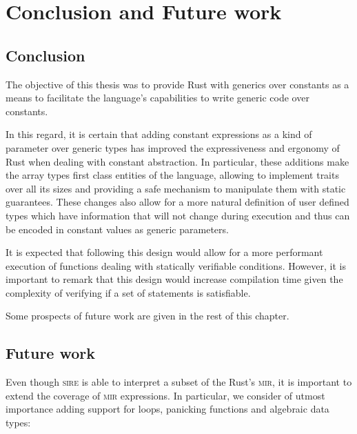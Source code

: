 \chapter{Conclusion and Future work}
\label{chap:conclusion}

\section{Conclusion}

The objective of this thesis was to provide Rust with generics over constants
as a means to facilitate the language's capabilities to write generic code over
constants.

In this regard, it is certain that adding constant expressions as a kind of
parameter over generic types has improved the expressiveness and ergonomy of
Rust when dealing with constant abstraction. In particular, these additions
make the array types first class entities of the language, allowing to
implement traits over all its sizes and providing a safe mechanism to
manipulate them with static guarantees. These changes also allow for a more
natural definition of user defined types which have information that will not
change during execution and thus can be encoded in constant values as generic
parameters.

It is expected that following this design would allow for a more performant
execution of functions dealing with statically verifiable conditions. However,
it is important to remark that this design would increase compilation time
given the complexity of verifying if a set of statements is satisfiable.

Some prospects of future work are given in the rest of this chapter.


\section{Future work}

Even though \textsc{sire} is able to interpret a subset of the Rust's
\textsc{mir}, it is important to extend the coverage of \textsc{mir}
expressions. In particular, we consider of utmost importance adding support for
loops, panicking functions and algebraic data types:

